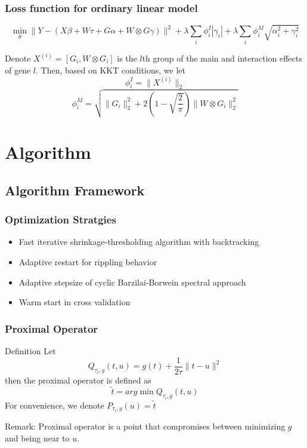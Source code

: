 \documentclass{beamer}
\begin{document}
\begin{frame}
\frametitle{Loss function for ordinary linear model}

$$\min_{\theta} \parallel Y-(X\beta + W\tau + G\alpha + W\otimes G \gamma) \parallel^2 + \lambda \sum_i \phi_i^I |\gamma_i| + \lambda \sum_i \phi_i^M \sqrt{\alpha_i^2 + \gamma_i^2}$$

Denote $X^{(i)}=[G_i,W\otimes G_i]$ is the $l$th group of the main and interaction effects of gene $l$.
Then, based on KKT conditions,  we let $$\phi_i^I=\parallel X^{(i)}\parallel_2$$ 
$$\phi_i^M=\sqrt{\parallel G_i\parallel_2^2+2(1-\sqrt{\frac{2}{\pi}}) \parallel W\otimes G_i\parallel_2^2}$$
\end{frame}


\section{Algorithm}

\subsection{Algorithm Framework}

\begin{frame}
\frametitle{Optimization Stratgies}
\begin{itemize}
\item Fast iterative shrinkage-thresholding algorithm with backtracking\cite{fasta}
\item Adaptive restart for rippling behavior \cite{restart}
\item Adaptive stepsize of cyclic Barzilai-Borwein spectral approach\cite{step}
\item Warm start in cross validation
\end{itemize}

\end{frame}


\begin{frame}
\frametitle{Proximal Operator}
\begin{block}{Definition}
Let $$Q_{\tau_i,g}(t,u)=g(t)+\frac{1}{2\tau}\parallel t-u\parallel^2$$
then the proximal operator is defined as $$\tilde{t}=arg\min Q_{\tau_i,g}(t,u)$$
For convenience, we denote $P_{\tau_i,g}(u)=\tilde{t}$
\end{block}
Remark: Proximal operator is a point that compromises between minimizing $g$ and being near to $u$. 
\end{frame}
\end{document}
